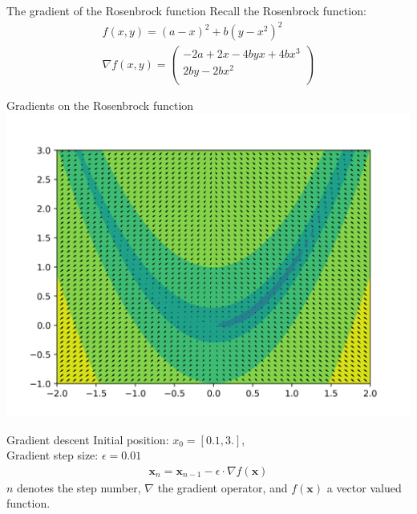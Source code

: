 \documentclass[notes]{beamer}
\begin{document}
    \begin{frame}{The gradient of the Rosenbrock function}
      Recall the Rosenbrock function:
      \begin{align}
        f(x, y) = (a - x)^2 + b(y - x^2)^2 \\
        \nabla f(x, y) = \begin{pmatrix}
          -2a + 2x - 4byx + 4bx^3 \\
          2by - 2bx^2 \\
        \end{pmatrix}
      \end{align}
    \end{frame}

    \begin{frame}{Gradients on the Rosenbrock function}
      \includegraphics[width=.9\linewidth]{./figures/quiver.png}
    \end{frame}

    \begin{frame}{Gradient descent}
      Initial position: $x_0 = [0.1, 3.]$, \\
      Gradient step size: $\epsilon = 0.01 $
      \begin{align}
        \mathbf{x}_n = \mathbf{x}_{n-1} - \epsilon \cdot \nabla f(\mathbf{x})
      \end{align}
      $n$ denotes the step number, $\nabla$ the gradient operator, and $f(\mathbf{x})$ a vector valued function.
    \end{frame}
\end{document}
